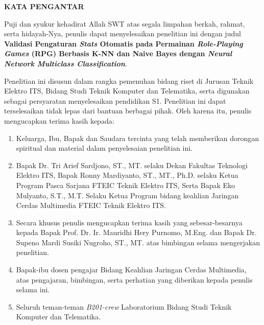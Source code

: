\begin{center}
\large\textbf{KATA PENGANTAR}
\end{center}
\vspace{2ex}

\setlength{\parindent}{1cm} Puji dan syukur kehadirat Allah SWT atas segala limpahan berkah, rahmat, serta hidayah-Nya, penulis  dapat menyelesaikan penelitian ini dengan judul \textbf{Validasi Pengaturan \textit{Stats} Otomatis pada Permainan \textit{Role-Playing Games} (RPG) Berbasis K-NN dan Naive Bayes dengan \textit{Neural Network Multiclass Classification}}.
\vspace{1ex}

Penelitian ini disusun dalam rangka pemenuhan bidang riset di Jurusan Teknik Elektro ITS, Bidang  Studi Teknik Komputer dan Telematika, serta digunakan sebagai persyaratan menyelesaikan pendidikan  S1. Penelitian ini dapat terselesaikan tidak lepas dari bantuan berbagai pihak. Oleh karena itu, penulis mengucapkan terima kasih kepada:
\vspace{1ex}

\begin{enumerate}[nolistsep]
	\item Keluarga, Ibu, Bapak dan Saudara tercinta yang telah memberikan dorongan spiritual dan material dalam penyelesaian penelitian ini.
	\vspace{1ex}
	\item Bapak Dr. Tri Arief Sardjono, ST., MT. selaku Dekan Fakultas Teknologi Elektro ITS, Bapak Ronny Mardiyanto, ST., MT., Ph.D. selaku Ketua Program Pasca Sarjana FTEIC Teknik Elektro ITS, Serta Bapak Eko Mulyanto, S.T., M.T. Selaku Ketua Program bidang keahlian Jaringan Cerdas Multimedia FTEIC Teknik Elektro ITS.
	\vspace{1ex}
	\item Secara khusus penulis mengucapkan terima kasih yang sebesar-besarnya kepada Bapak Prof. Dr. Ir. Mauridhi Hery Purnomo, M.Eng. dan Bapak Dr. Supeno Mardi Susiki Nugroho, ST., MT. atas bimbingan selama mengerjakan  penelitian.
	\vspace{1ex}
	\item Bapak-ibu dosen pengajar Bidang Keahlian Jaringan Cerdas Multimedia, atas pengajaran,  bimbingan, serta perhatian yang diberikan kepada penulis selama ini.
	\vspace{1ex}
	\item Seluruh teman-teman \textit{B201-crew} Laboratorium Bidang Studi Teknik Komputer dan Telematika.
\end{enumerate}
\vspace{1ex}

